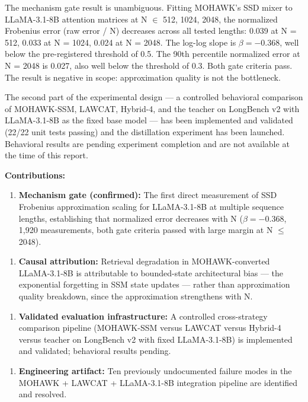 The mechanism gate result is unambiguous. Fitting MOHAWK's SSD mixer to LLaMA-3.1-8B attention matrices at N $\in$ {512, 1024, 2048}, the normalized Frobenius error (raw error / N) decreases across all tested lengths: 0.039 at N = 512, 0.033 at N = 1024, 0.024 at N = 2048. The log-log slope is $\beta = -0.368$, well below the pre-registered threshold of 0.5. The 90th percentile normalized error at N = 2048 is 0.027, also well below the threshold of 0.3. Both gate criteria pass. The result is negative in scope: approximation quality is not the bottleneck.

The second part of the experimental design --- a controlled behavioral comparison of MOHAWK-SSM, LAWCAT, Hybrid-4, and the teacher on LongBench v2 with LLaMA-3.1-8B as the fixed base model --- has been implemented and validated (22/22 unit tests passing) and the distillation experiment has been launched. Behavioral results are pending experiment completion and are not available at the time of this report.

\textbf{Contributions:}

\begin{enumerate}
\item \textbf{Mechanism gate (confirmed):} The first direct measurement of SSD Frobenius approximation scaling for LLaMA-3.1-8B at multiple sequence lengths, establishing that normalized error decreases with N ($\beta = -0.368$, 1,920 measurements, both gate criteria passed with large margin at N $\leq$ 2048).
\end{enumerate}

\begin{enumerate}
\item \textbf{Causal attribution:} Retrieval degradation in MOHAWK-converted LLaMA-3.1-8B is attributable to bounded-state architectural bias --- the exponential forgetting in SSM state updates --- rather than approximation quality breakdown, since the approximation strengthens with N.
\end{enumerate}

\begin{enumerate}
\item \textbf{Validated evaluation infrastructure:} A controlled cross-strategy comparison pipeline (MOHAWK-SSM versus LAWCAT versus Hybrid-4 versus teacher on LongBench v2 with fixed LLaMA-3.1-8B) is implemented and validated; behavioral results pending.
\end{enumerate}

\begin{enumerate}
\item \textbf{Engineering artifact:} Ten previously undocumented failure modes in the MOHAWK + LAWCAT + LLaMA-3.1-8B integration pipeline are identified and resolved.
\end{enumerate}

